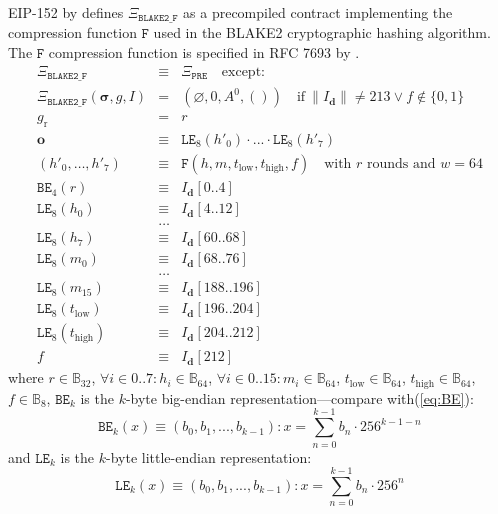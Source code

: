 \documentclass[9pt,oneside]{amsart}
\begin{document}
EIP-152 by \cite{EIP-152} defines $\Xi_{\mathtt{BLAKE2\_F}}$ as a precompiled contract implementing the compression function $\mathtt{F}$ used in the BLAKE2 cryptographic hashing algorithm.
The $\mathtt{F}$ compression function is specified in RFC 7693 by \cite{RFC-7693}.
\begin{eqnarray}
  \Xi_{\mathtt{BLAKE2\_F}}&\equiv&\Xi_{\mathtt{PRE}}\quad\text{except:}\\
  \Xi_{\mathtt{BLAKE2\_F}}(\boldsymbol\sigma,g,I)&=&\left(\varnothing,0,A^0,()\right)\quad\text{if}\ \lVert I_{\mathbf{d}}\rVert \neq 213 \vee f \notin \{0, 1\} \\
  g_{\mathrm{r}} &=& r\\
  \mathbf{o} &\equiv& \mathtt{LE}_8(h'_0)\cdot ... \cdot \mathtt{LE}_8(h'_7) \\
  (h'_0,\dots,h'_7) &\equiv& \mathtt{F}(h, m, t_\mathrm{low}, t_\mathrm{high}, f) \quad\text{with } r \text{ rounds and } w = 64 \\
  \mathtt{BE}_4(r) &\equiv& I_{\mathbf{d}}[0..4] \\
  \mathtt{LE}_8(h_0) &\equiv& I_{\mathbf{d}}[4..12] \\
  &\dots& \\
  \mathtt{LE}_8(h_7) &\equiv& I_{\mathbf{d}}[60..68] \\
  \mathtt{LE}_8(m_0) &\equiv& I_{\mathbf{d}}[68..76] \\
  &\dots& \\
  \mathtt{LE}_8(m_{15}) &\equiv& I_{\mathbf{d}}[188..196] \\
  \mathtt{LE}_8(t_\mathrm{low}) &\equiv& I_{\mathbf{d}}[196..204] \\
  \mathtt{LE}_8(t_\mathrm{high}) &\equiv& I_{\mathbf{d}}[204..212] \\
  f &\equiv& I_{\mathbf{d}}[212]
\end{eqnarray}
where $r \in \mathbb{B}_{32}$, $\forall i \in 0..7: h_i \in \mathbb{B}_{64}$, $\forall i \in 0..15: m_i \in \mathbb{B}_{64}$,
$t_\mathrm{low} \in \mathbb{B}_{64}$, $t_\mathrm{high} \in \mathbb{B}_{64}$, $f \in \mathbb{B}_8$,
$\mathtt{BE}_k$ is the $k$-byte big-endian representation---compare with(\ref{eq:BE}):
\begin{equation}
  \mathtt{BE}_k(x) \equiv (b_0, b_1, ..., b_{k-1}): x = \sum_{n = 0}^{k-1} b_n \cdot 256^{k-1-n}
\end{equation}
and $\mathtt{LE}_k$ is the $k$-byte little-endian representation:
\begin{equation}
  \mathtt{LE}_k(x) \equiv (b_0, b_1, ..., b_{k-1}): x = \sum_{n = 0}^{k-1} b_n \cdot 256^n
\end{equation}
\end{document}
